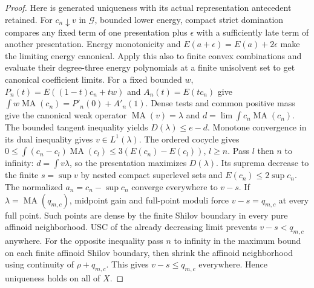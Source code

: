 \documentclass[11pt]{article}
\newcommand{\MA}{\operatorname{MA}}
\begin{document}
\begin{proof}
Here is generated uniqueness with its actual representation antecedent
retained. For $c_n\downarrow v$ in $\mathcal G$, bounded lower energy,
compact strict domination compares any fixed term of one presentation
plus $\epsilon$ with a sufficiently late term of another presentation.
Energy monotonicity and $E(a+\epsilon)=E(a)+2\epsilon$ make the
limiting energy canonical. Apply this also to finite convex combinations
and evaluate their degree-three energy polynomials at a finite unisolvent
set to get canonical coefficient limits. For a fixed bounded $w$,
$P_n(t)=E((1-t)c_n+tw)$ and $A_n(t)=E(tc_n)$ give
$\int w\MA(c_n)=P'_n(0)+A'_n(1)$.
Dense tests and common positive mass give the canonical weak operator
$\MA(v)=\lambda$ and $d=\lim\int c_n\MA(c_n)$.
The bounded tangent inequality yields $D(\lambda)\le e-d$.
Monotone convergence in its dual inequality gives $v\in L^1(\lambda)$.
The ordered cocycle gives
$0\le\int(c_n-c_l)\MA(c_l)\le3(E(c_n)-E(c_l))$, $l\ge n$.
Pass $l$ then $n$ to infinity: $d=\int v\lambda$, so the presentation
maximizes $D(\lambda)$.
Its suprema decrease to the finite $s=\sup v$ by nested compact
superlevel sets and $E(c_n)\le2\sup c_n$.
The normalized $a_n=c_n-\sup c_n$ converge everywhere to $v-s$.
If $\lambda=\MA(q_{m,c})$, midpoint gain and full-point moduli force
$v-s=q_{m,c}$ at every full point. Such points are dense by the
finite Shilov boundary in every pure affinoid neighborhood.
USC of the already decreasing limit prevents $v-s<q_{m,c}$ anywhere.
For the opposite inequality pass $n$ to infinity in the maximum bound
on each finite affinoid Shilov boundary, then shrink the affinoid
neighborhood using continuity of $\rho+q_{m,c}$. This gives
$v-s\le q_{m,c}$ everywhere. Hence uniqueness holds on all of $X$.
\end{proof}
\end{document}
